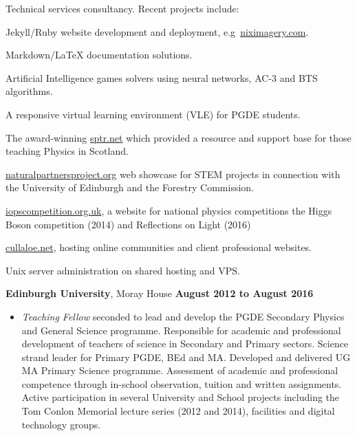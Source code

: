 \documentclass[10pt]{article}
\renewcommand{\section}[2]%
        {\pagebreak[2]\vspace{1.3\baselineskip}%
         \phantomsection\addcontentsline{toc}{section}{#1}%
         \hspace{0in}%
         \marginpar{
         \raggedright \scshape #1}#2}
\newenvironment{outerlist}[1][\enskip\textbullet]%
        {\begin{itemize}[#1]}{\end{itemize}%
         \vspace{-.6\baselineskip}}
\newenvironment{innerlist}[1][\enskip\textbullet]%
        {\begin{compactitem}[#1]}{\end{compactitem}}
\begin{document}
\begin{outerlist}
\item[]Technical services consultancy. Recent projects include:

\begin{innerlist}
  \item Jekyll/Ruby website development and deployment, e.g\ \href{https://niximagery.com}{niximagery.com}.
  \item Markdown/\LaTeX \- documentation solutions.
  \item Artificial Intelligence games solvers using neural networks, AC-3 and BTS algorithms.
  \item A responsive virtual learning environment (VLE) for PGDE students.
  \item The award-winning \href{http://sptr.net}{sptr.net} which provided a resource and support base for those teaching Physics in Scotland.
  \item \href{http://naturalpartnersproject.org/}{naturalpartnersproject.org} web showcase for STEM projects in connection with the University of Edinburgh and the Forestry Commission.
  \item \href{http://iopscompetition.org.uk/}{iopscompetition.org.uk}, a website for national physics competitions the Higgs Boson competition (2014) and Reflections on Light (2016)
  \item \href{http://cullaloe.net}{cullaloe.net}, hosting online communities and client professional websites.
  \item Unix server administration on shared hosting and VPS.
\end{innerlist}
\end{outerlist}

\section{}
\textbf{Edinburgh University}, Moray House       \hfill \textbf{August 2012 to August 2016}

\begin{outerlist}

\item[] \textit{Teaching Fellow} seconded to lead and develop the PGDE Secondary Physics and General Science programme. Responsible for academic and professional development of teachers of science in Secondary and Primary sectors. Science strand leader for Primary PGDE, BEd and MA. Developed and delivered UG MA Primary Science programme. Assessment of academic and professional competence through in-school observation, tuition and written assignments. Active participation in several University and School projects including the Tom Conlon Memorial lecture series (2012 and 2014), facilities and digital technology groups.
\end{outerlist}
\end{document}
